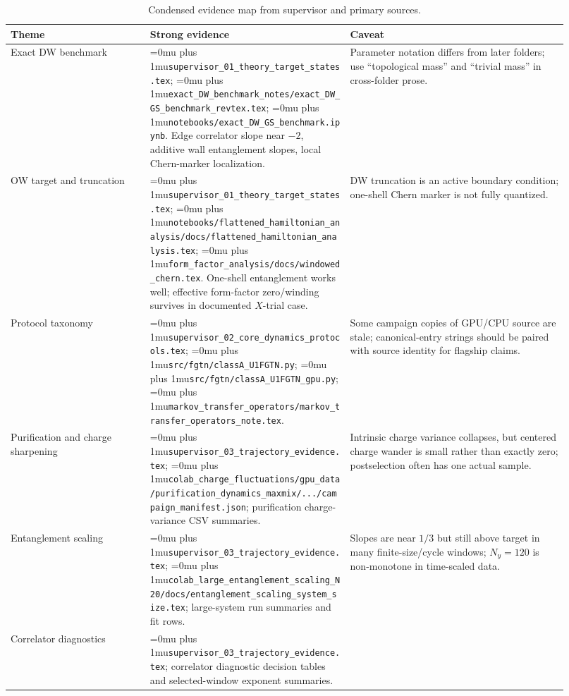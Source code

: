 \documentclass[aps,prb,onecolumn,nofootinbib,superscriptaddress]{revtex4-2}
\newcommand{\src}[1]{\begingroup\ttfamily\Urlmuskip=0mu plus 1mu\relax\nolinkurl{#1}\endgroup}
\begin{document}
\begin{table}[h]
\caption{Condensed evidence map from supervisor and primary sources.}
\begin{ruledtabular}
\begin{tabular}{p{0.23\linewidth}p{0.33\linewidth}p{0.36\linewidth}}
Theme & Strong evidence & Caveat \\
\hline
Exact DW benchmark &
\src{supervisor_01_theory_target_states.tex}; \src{exact_DW_benchmark_notes/exact_DW_GS_benchmark_revtex.tex}; \src{notebooks/exact_DW_GS_benchmark.ipynb}.  Edge correlator slope near \(-2\), additive wall entanglement slopes, local Chern-marker localization. &
Parameter notation differs from later folders; use ``topological mass'' and ``trivial mass'' in cross-folder prose. \\
OW target and truncation &
\src{supervisor_01_theory_target_states.tex}; \src{notebooks/flattened_hamiltonian_analysis/docs/flattened_hamiltonian_analysis.tex}; \src{form_factor_analysis/docs/windowed_chern.tex}.  One-shell entanglement works well; effective form-factor zero/winding survives in documented \(X\)-trial case. &
DW truncation is an active boundary condition; one-shell Chern marker is not fully quantized. \\
Protocol taxonomy &
\src{supervisor_02_core_dynamics_protocols.tex}; \src{src/fgtn/classA_U1FGTN.py}; \src{src/fgtn/classA_U1FGTN_gpu.py}; \src{markov_transfer_operators/markov_transfer_operators_note.tex}. &
Some campaign copies of GPU/CPU source are stale; canonical-entry strings should be paired with source identity for flagship claims. \\
Purification and charge sharpening &
\src{supervisor_03_trajectory_evidence.tex}; \src{colab_charge_fluctuations/gpu_data/purification_dynamics_maxmix/.../campaign_manifest.json}; purification charge-variance CSV summaries. &
Intrinsic charge variance collapses, but centered charge wander is small rather than exactly zero; postselection often has one actual sample. \\
Entanglement scaling &
\src{supervisor_03_trajectory_evidence.tex}; \src{colab_large_entanglement_scaling_N20/docs/entanglement_scaling_system_size.tex}; large-system run summaries and fit rows. &
Slopes are near \(1/3\) but still above target in many finite-size/cycle windows; \(N_y=120\) is non-monotone in time-scaled data. \\
Correlator diagnostics &
\src{supervisor_03_trajectory_evidence.tex}; correlator diagnostic decision tables and selected-window exponent summaries. &

\end{tabular}
\end{ruledtabular}
\end{table}
\end{document}
